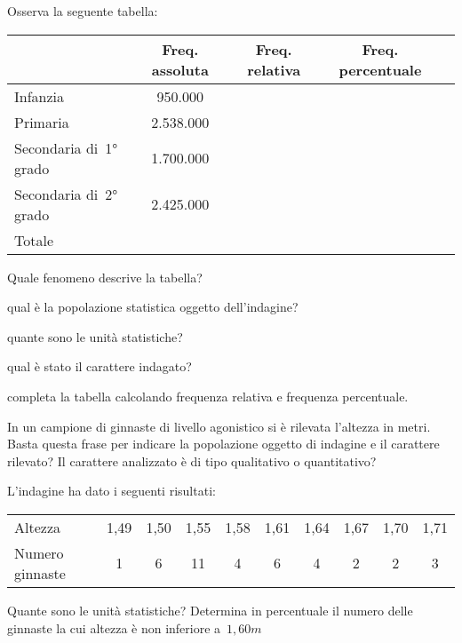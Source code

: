 \begin{esercizio}
\label{ese:A.7}
Osserva la seguente tabella:
 \begin{center}
 \begin{tabularx}{.92\textwidth}{Xcccc}
\toprule
 & Freq. assoluta & Freq. relativa & Freq. percentuale \\
\midrule
Infanzia & 950.000 & & \\
Primaria & 2.538.000 & & \\
Secondaria di~1° grado & 1.700.000 & & \\
Secondaria di~2° grado & 2.425.000 & & \\
Totale & & & \\
\bottomrule
\end{tabularx}
 \end{center}
\begin{itemize*}
\item Quale fenomeno descrive la tabella?
\item qual è la popolazione statistica oggetto dell'indagine?
\item quante sono le unità statistiche?
\item qual è stato il carattere indagato?
\item completa la tabella calcolando frequenza relativa e frequenza 
percentuale.
\end{itemize*}
\end{esercizio}

\begin{esercizio}
\label{ese:A.8}
In un campione di ginnaste di livello agonistico si è rilevata l'altezza in 
metri. Basta questa frase per indicare la popolazione oggetto
di indagine e il carattere rilevato? Il carattere analizzato è di tipo 
qualitativo o quantitativo?

L'indagine ha dato i seguenti risultati:
\begin{center}
 \begin{tabular}{lccccccccc}
\toprule
Altezza & 1,49 & 1,50 & 1,55 & 1,58 & 1,61 & 1,64 & 1,67 & 1,70 & 1,71 \\
Numero ginnaste & 1 & 6 & 11 & 4 & 6 & 4 & 2 & 2 & 3 \\
\bottomrule
\end{tabular}
\end{center}
Quante sono le unità statistiche? Determina in percentuale il numero delle 
ginnaste la cui altezza è non inferiore a~\(1,60 \unit{m}\)
\end{esercizio}

